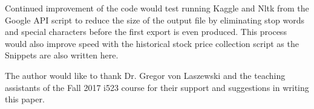 \documentclass[sigconf]{acmart}
\begin{document}
Continued improvement of the code would test running Kaggle and Nltk from the Google API script to reduce the size of the output file by eliminating stop words and special characters before the first export is even produced. This process would also improve speed with the historical stock price collection script as the Snippets are also written here.


\begin{acks}

The author would like to thank Dr. Gregor von Laszewski and the teaching assistants of the Fall 2017 i523 course for their support and suggestions in writing this paper. 

\end{acks}


 
\end{document}
